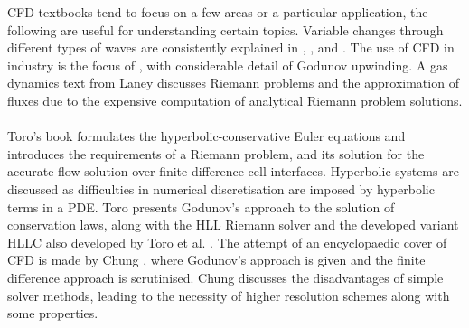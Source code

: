 	CFD textbooks tend to focus on a few areas or a particular application, the following are useful for understanding certain topics. Variable changes through different types of waves are consistently explained in \cite{Anderson04}, \cite{Laney98}, \cite{Oosthuizen97} and \cite{Thompson72}. The use of CFD in industry is the focus of \cite{Jayanti18}, with considerable detail of Godunov upwinding. A gas dynamics text from Laney \cite{Laney98} discusses Riemann problems and the approximation of fluxes due to the expensive computation of analytical Riemann problem solutions.
	\\ \\
	Toro's book \cite{Toro09} formulates the hyperbolic-conservative Euler equations and introduces the requirements of a Riemann problem, and its solution for the accurate flow solution over finite difference cell interfaces. Hyperbolic systems are discussed as difficulties in numerical discretisation are imposed by hyperbolic terms in a PDE. Toro presents Godunov’s approach to the solution of conservation laws, along with the HLL Riemann solver and the developed variant HLLC also developed by Toro et al. \cite{Toro92}. The attempt of an encyclopaedic cover of CFD is made by Chung \cite{Chung02}, where Godunov's approach is given and the finite difference approach is scrutinised. Chung discusses the disadvantages of simple solver methods, leading to the necessity of higher resolution schemes along with some properties.
	\\ \\
